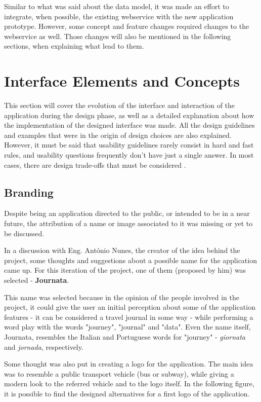 Similar to what was said about the data model, it was made an effort to integrate, when possible, the existing webservice with the new application prototype. However, some concept and feature changes required changes to the webservice as well. Those changes will also be mentioned in the following sections, when explaining what lead to them.

\clearpage

\section{Interface Elements and Concepts}\label{interfacecon}

This section will cover the evolution of the interface and interaction of the application during the design phase, as well as a detailed explanation about how the implementation of the designed interface was made.
All the design guidelines and examples that were in the origin of design choices are also explained. However, it must be said that usability guidelines rarely consist in hard and fast rules, and usability questions frequently don't have just a single answer. In most cases, there are design trade-offs that must be considered \cite{kn:NB13}.

\subsection{Branding}

Despite being an application directed to the public, or intended to be in a near future, the attribution of a name or image associated to it was missing or yet to be discussed.


In a discussion with Eng. António Nunes, the creator of the idea behind the project, some thoughts and suggestions about a possible name for the application came up. For this iteration of the project, one of them (proposed by him) was selected - \textbf{Journata}.

This name was selected because in the opinion of the people involved in the project, it could give the user an initial perception about some of the application features - it can be considered a travel journal in some way - while performing a word play with the words "journey", "journal" and "data". Even the name itself, Journata, resembles the Italian and Portuguese words for "journey" - \emph{giornata} and \emph{jornada}, respectively.

Some thought was also put in creating a logo for the application. The main idea was to resemble a public transport vehicle (bus or subway), while giving a modern look to the referred vehicle and to the logo itself. In the following figure, it is possible to find the designed alternatives for a first logo of the application. 

